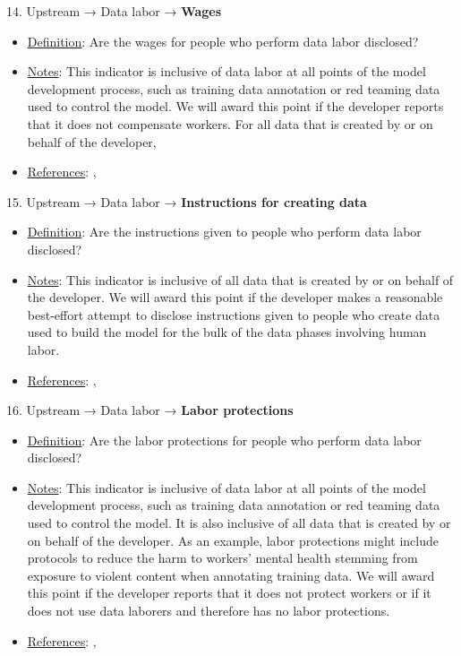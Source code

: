 14. Upstream → Data labor → \textbf{Wages}
\vspace{-\parskip}
\begin{itemize}
	\item
	\underline{Definition}: Are the wages for people who perform data labor disclosed?
	\item
	\underline{Notes}: This indicator is inclusive of data labor at all points of the model development process, such as training data annotation or red teaming data used to control the model. We will award this point if the developer reports that it does not compensate workers. For all data that is created by or on behalf of the developer, 
	\item
	\underline{References}: \citet{kittur2013future}, \citet{dzieza2023ai}
\end{itemize}


15. Upstream → Data labor → \textbf{Instructions for creating data}
\vspace{-\parskip}
\begin{itemize}
	\item
	\underline{Definition}: Are the instructions given to people who perform data labor disclosed?
	\item
	\underline{Notes}: This indicator is inclusive of all data that is created by or on behalf of the developer. We will award this point if the developer makes a reasonable best-effort attempt to disclose instructions given to people who create data used to build the model for the bulk of the data phases involving human labor.
	\item
	\underline{References}: \citet{sambasivan2021everyone}, \citet{kittur2013future}
\end{itemize}


16. Upstream → Data labor → \textbf{Labor protections}
\vspace{-\parskip}
\begin{itemize}
	\item
	\underline{Definition}: Are the labor protections for people who perform data labor disclosed?
	\item
	\underline{Notes}: This indicator is inclusive of data labor at all points of the model development process, such as training data annotation or red teaming data used to control the model. It is also inclusive of all data that is created by or on behalf of the developer. As an example, labor protections might include protocols to reduce the harm to workers' mental health stemming from exposure to violent content when annotating training data. We will award this point if the developer reports that it does not protect workers or if it does not use data laborers and therefore has no labor protections.
	\item
	\underline{References}: \citet{crawford2021atlas}, \citet{gray2019ghost}
\end{itemize}


